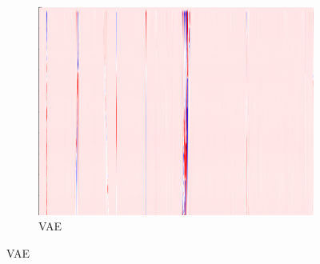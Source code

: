 \begin{figure}[h]
\begin{subfigure}{0.33\textwidth}
        \includegraphics[width=\textwidth]{figures/test.png}
        \caption{VAE}
    \end{subfigure}
    
    \vspace{1em}
    

\end{figure}
